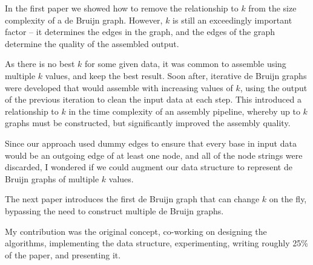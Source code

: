 In the first paper we showed how to remove the relationship to $k$ from the size complexity of a de Bruijn graph. However, $k$ is still an exceedingly important factor -- it determines the edges in the graph, and the edges of the graph determine the quality of the assembled output.

As there is no best $k$ for some given data, it was common to assemble using multiple $k$ values, and keep the best result. Soon after, iterative de Bruijn graphs were developed that would assemble with increasing values of $k$, using the output of the previous iteration to clean the input data at each step. This introduced a relationship to $k$ in the time complexity of an assembly pipeline, whereby up to $k$ graphs must be constructed, but significantly improved the assembly quality.

Since our approach used dummy edges to ensure that every base in input data would be an outgoing edge of at least one node, and all of the node strings were discarded, I wondered if we could augment our data structure to represent de Bruijn graphs of multiple $k$ values.

The next paper introduces the first de Bruijn graph that can change $k$ on the fly, bypassing the need to construct multiple de Bruijn graphs.

My contribution was the original concept, co-working on designing the algorithms, implementing the data structure, experimenting, writing roughly 25\% of the paper, and presenting it.

